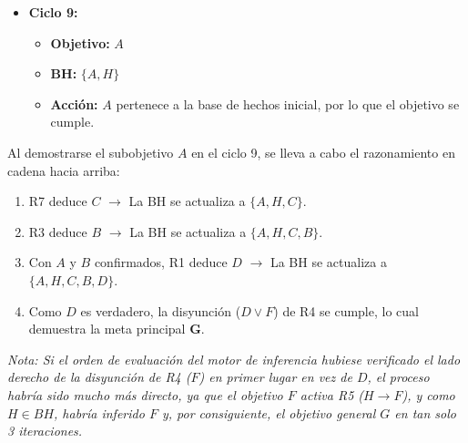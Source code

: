 \documentclass[11pt, a4paper]{article}
\newenvironment{problem}[1][Cuestión]{
	\vspace{0.5cm}
	\noindent{\Large\bfseries #1} \par\vspace{0.5cm}
}{
	\vspace{0.5cm}
}
\begin{document}
\begin{problem}[Cuestión 3 (30 \%)]
{\begin{itemize}
				\item \textbf{Ciclo 9:}
					\begin{itemize}
						\item \textbf{Objetivo:} $A$
						\item \textbf{BH:} $\{A, H\}$
						\item \textbf{Acción:} $A$ pertenece a la base de hechos inicial, por lo que el objetivo se cumple.
					\end{itemize}
				\end{itemize}

			Al demostrarse el subobjetivo $A$ en el ciclo 9, se lleva a cabo el razonamiento en cadena hacia arriba:

			\begin{enumerate}
				\item R7 deduce $C$ $\rightarrow$ La BH se actualiza a $\{A, H, C\}$.
				\item R3 deduce $B$ $\rightarrow$ La BH se actualiza a $\{A, H, C, B\}$.
				\item Con $A$ y $B$ confirmados, R1 deduce $D$ $\rightarrow$ La BH se actualiza a $\{A, H, C, B, D\}$.
				\item Como $D$ es verdadero, la disyunción ($D \vee F$) de R4 se cumple, lo cual demuestra la meta principal \textbf{G}.
			\end{enumerate}

			\textit{Nota: Si el orden de evaluación del motor de inferencia hubiese verificado el lado derecho de la disyunción de R4 ($F$) en primer lugar en vez de $D$, el proceso habría sido mucho más directo, ya que el objetivo $F$ activa R5 ($H \rightarrow F$), y como $H \in BH$, habría inferido $F$ y, por consiguiente, el objetivo general $G$ en tan solo 3 iteraciones.}
		}
	\end{problem}
\end{document}
